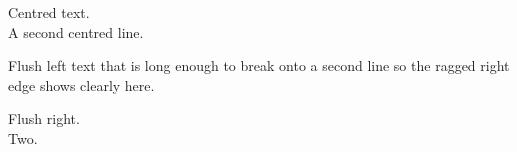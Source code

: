 \documentclass{article}
\begin{document}
\begin{center}
Centred text.\\ A second centred line.
\end{center}
\begin{flushleft}
Flush left text that is long enough to break onto a second line so the ragged right edge
shows clearly here.
\end{flushleft}
\begin{flushright}
Flush right.\\ Two.
\end{flushright}
\end{document}
